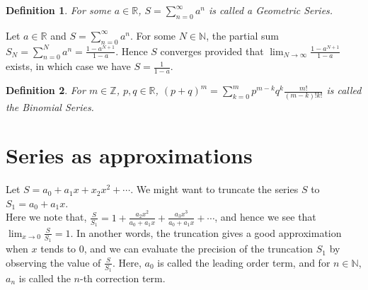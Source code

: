 \documentclass[11pt]{article}
\theoremstyle{break}
\theoremstyle{break}
\newtheorem{defn}{Definition}[corL]
\newcommand{\R}{\mathbb{R}}
\newcommand{\N}{\mathbb{N}}
\newcommand{\Z}{\mathbb{Z}}
\begin{document}
\begin{defn}
For some $a\in \R$, $S = \sum_{n=0}^\infty a^n$ is called a Geometric Series.
\end{defn}

Let $a \in \R$ and $S = \sum_{n=0}^\infty a^n$. For some $N \in \N$, the partial sum $S_N = \sum_{n=0}^N a^n = \frac{1-a^{N+1}}{1-a}$. Hence $S$ converges provided that $\lim_{N \to \infty} \frac{1-a^{N+1}}{1-a}$ exists, in which case we have $S = \frac{1}{1-a}$.

\begin{defn}
For $m \in \Z$, $p,q \in \R$, $(p+q)^m = \sum_{k=0}^m p^{m-k}q^k\frac{m!}{(m-k)!k!}$ is called the Binomial Series.
\end{defn}
\newpage

\section{\color{red} Series as approximations}
Let $S = a_0 + a_1 x+x_2 x^2 +\cdots $. We might want to truncate the series $S$ to $S_1 = a_0 + a_1 x$.\\
Here we note that, $\frac{S}{S_1} = 1+ \frac{a_2 x^2}{a_0+a_1x}+\frac{a_3x^3}{a_0+a_1x}+ \cdots$, and hence we see that $\lim_{x \to 0} \frac{S}{S_1} = 1$. In another words, the truncation gives a good approximation when $x$ tends to $0$, and we can evaluate the precision of the truncation $S_1$ by observing the value of $\frac{S}{S_1}$. Here, $a_0$ is called the leading order term, and for $n \in \N$, $a_n$ is called the $n$-th correction term.\\
\end{document}
